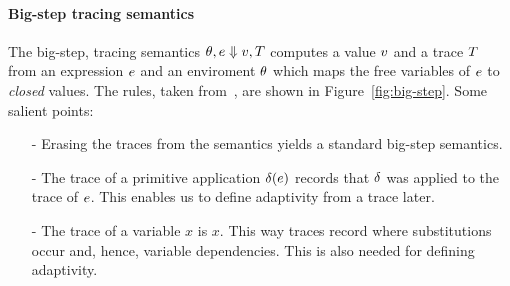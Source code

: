 \documentclass[a4paper,11pt]{article}
\theoremstyle{definition}
\begin{document}
\paragraph{Big-step tracing semantics}
The big-step, tracing semantics $\theta, e \mathrel{\Downarrow} v, T$
computes a value $v$ and a trace $T$ from an expression $e$
and an enviroment $\theta$ which maps the free variables of $e$ to
\emph{closed} values. The rules, taken from~\cite{perera:dep}, are
shown in Figure~\ref{fig:big-step}. Some salient points:
\begin{itemize}
\item[-] Erasing the traces from the semantics yields a standard
  big-step semantics.
\item[-] The trace of a primitive application $\delta(e)$
  records that $\delta$ was applied to the trace of
  $e$. This enables us to define adaptivity from a trace later.
\item[-] The trace of a variable $x$ is $x$. This way traces record
  where substitutions occur and, hence, variable dependencies. This is
  also needed for defining adaptivity.
\end{itemize}
\end{document}
